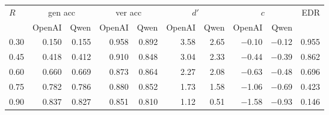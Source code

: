 \begin{tabular}{lrrrrrrrrr}
\toprule
\multirow{2}{*}{$R$} & \multicolumn{2}{c}{gen acc} & \multicolumn{2}{c}{ver acc} & \multicolumn{2}{c}{$d'$} & \multicolumn{2}{c}{$c$} & \multirow{2}{*}{EDR} \\
\cmidrule(lr){2-3} \cmidrule(lr){4-5} \cmidrule(lr){6-7} \cmidrule(lr){8-9}
 & OpenAI & Qwen & OpenAI & Qwen & OpenAI & Qwen & OpenAI & Qwen & \\
\midrule
0.30 & 0.150 & 0.155 & 0.958 & 0.892 & 3.58 & 2.65 & $-$0.10 & $-$0.12 & 0.955 \\
0.45 & 0.418 & 0.412 & 0.910 & 0.848 & 3.04 & 2.33 & $-$0.44 & $-$0.39 & 0.862 \\
0.60 & 0.660 & 0.669 & 0.873 & 0.864 & 2.27 & 2.08 & $-$0.63 & $-$0.48 & 0.696 \\
0.75 & 0.782 & 0.786 & 0.880 & 0.852 & 1.73 & 1.58 & $-$1.06 & $-$0.69 & 0.423 \\
0.90 & 0.837 & 0.827 & 0.851 & 0.810 & 1.12 & 0.51 & $-$1.58 & $-$0.93 & 0.146 \\
\bottomrule
\end{tabular}
